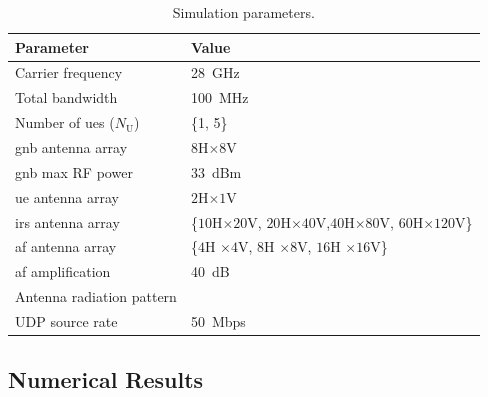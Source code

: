 \def\arraystretch{1.3}
\begin{table}[t!]
  \caption{Simulation parameters.}
  \label{Tab:parameters}
  \centering
  \footnotesize
  \begin{tabular}{l|l}
    \toprule
    Parameter                  & Value \\ \midrule
    Carrier frequency		   & 28~GHz	\\
    Total bandwidth			   & 100~MHz \\
    Number of \glspl{ue} ($N_{\mathrm U}$)  & \{1, 5\} \\
    \gls{gnb} antenna array    & $8$H$\times8$V \\
    \gls{gnb} max RF power	   & 33~dBm \\
    \gls{ue} antenna array     & $2$H$\times1$V \\
    \gls{irs} antenna array    & \{$10$H$\times20$V, $20$H$\times40$V,$ 40$H$\times80$V, $60$H$\times120$V\} \\
    \gls{af} antenna array     & \{$4$H $\times4$V, $8$H $\times8$V, $16$H $\times16$V\} \\
    \gls{af} amplification & 40~dB \\
    Antenna radiation pattern  & \cite[Table 7.3-1]{3gpp.38.901} \\
    UDP source rate			   & 50~Mbps\\
    \bottomrule
  \end{tabular}
\end{table}




\subsection{Numerical Results} %
\label{sub:numerical_results}

